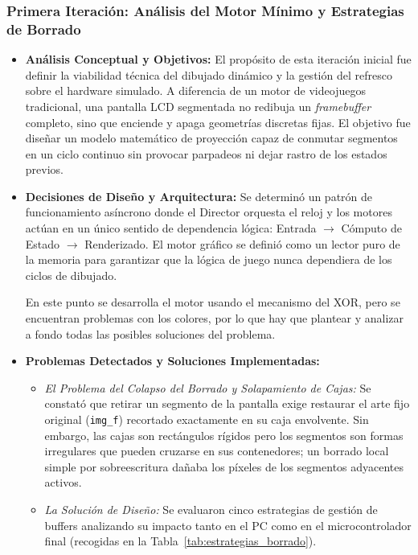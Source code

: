\subsubsection{Primera Iteración: Análisis del Motor Mínimo y Estrategias de Borrado}
\begin{itemize}
	\item \textbf{Análisis Conceptual y Objetivos:} El propósito de esta iteración inicial fue definir la viabilidad técnica del dibujado dinámico y la gestión del refresco sobre el hardware simulado. A diferencia de un motor de videojuegos tradicional, una pantalla LCD segmentada no redibuja un \textit{framebuffer} completo, sino que enciende y apaga geometrías discretas fijas. El objetivo fue diseñar un modelo matemático de proyección capaz de conmutar segmentos en un ciclo continuo sin provocar parpadeos ni dejar rastro de los estados previos.
	\item \textbf{Decisiones de Diseño y Arquitectura:} Se determinó un patrón de funcionamiento asíncrono donde el Director orquesta el reloj y los motores actúan en un único sentido de dependencia lógica: Entrada $\rightarrow$ Cómputo de Estado $\rightarrow$ Renderizado. El motor gráfico se definió como un lector puro de la memoria para garantizar que la lógica de juego nunca dependiera de los ciclos de dibujado.
	
	En este punto se desarrolla el motor usando el mecanismo del XOR, pero se encuentran problemas con los colores, por lo que hay que plantear y analizar a fondo todas las posibles soluciones del problema.
	
	\item \textbf{Problemas Detectados y Soluciones Implementadas:} 
	\begin{itemize}
		\item \textit{El Problema del Colapso del Borrado y Solapamiento de Cajas:} Se constató que retirar un segmento de la pantalla exige restaurar el arte fijo original (\texttt{img\_f}) recortado exactamente en su caja envolvente. Sin embargo, las cajas son rectángulos rígidos pero los segmentos son formas irregulares que pueden cruzarse en sus contenedores; un borrado local simple por sobreescritura dañaba los píxeles de los segmentos adyacentes activos.
		\item \textit{La Solución de Diseño:} Se evaluaron cinco estrategias de gestión de buffers analizando su impacto tanto en el PC como en el microcontrolador final (recogidas en la Tabla~\ref{tab:estrategias_borrado}).
	\end{itemize}
\end{itemize}

